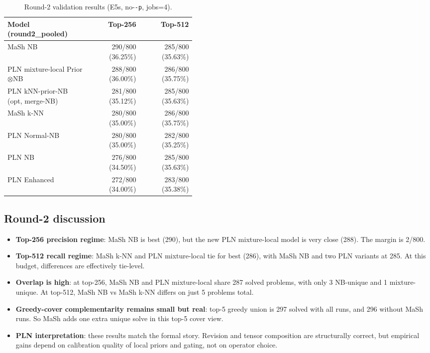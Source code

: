 \documentclass[11pt]{article}
\begin{document}
\begin{table}[h]
\centering
\begin{scriptsize}
\begin{tabular}{p{0.44\linewidth}rr}
\hline
Model (round2\_pooled) & Top-256 & Top-512 \\
\hline
MaSh NB & 290/800 (36.25\%) & 285/800 (35.63\%) \\
PLN mixture-local Prior$\otimes$NB & 288/800 (36.00\%) & 286/800 (35.75\%) \\
PLN kNN-prior-NB (opt, merge-NB) & 281/800 (35.12\%) & 285/800 (35.63\%) \\
MaSh k-NN & 280/800 (35.00\%) & 286/800 (35.75\%) \\
PLN Normal-NB & 280/800 (35.00\%) & 282/800 (35.25\%) \\
PLN NB & 276/800 (34.50\%) & 285/800 (35.63\%) \\
PLN Enhanced & 272/800 (34.00\%) & 283/800 (35.38\%) \\
\hline
\end{tabular}
\end{scriptsize}
\caption{Round-2 validation results (E5s, no-\texttt{-p}, jobs=4).}
\label{tab:r2val}
\end{table}

\subsection{Round-2 discussion}
\begin{itemize}
\item \textbf{Top-256 precision regime}: MaSh NB is best (290), but the new
      PLN mixture-local model is very close (288). The margin is 2/800.

\item \textbf{Top-512 recall regime}: MaSh k-NN and PLN mixture-local tie for best
      (286), with MaSh NB and two PLN variants at 285. At this budget, differences
      are effectively tie-level.

\item \textbf{Overlap is high}: at top-256, MaSh NB and PLN mixture-local share
      287 solved problems, with only 3 NB-unique and 1 mixture-unique. At top-512,
      MaSh NB vs MaSh k-NN differs on just 5 problems total.

\item \textbf{Greedy-cover complementarity remains small but real}: top-5 greedy
      union is 297 solved with all runs, and 296 without MaSh runs. So MaSh adds
      one extra unique solve in this top-5 cover view.

\item \textbf{PLN interpretation}: these results match the formal story. Revision
      and tensor composition are structurally correct, but empirical gains depend on
      calibration quality of local priors and gating, not on operator choice.
\end{itemize}
\end{document}
